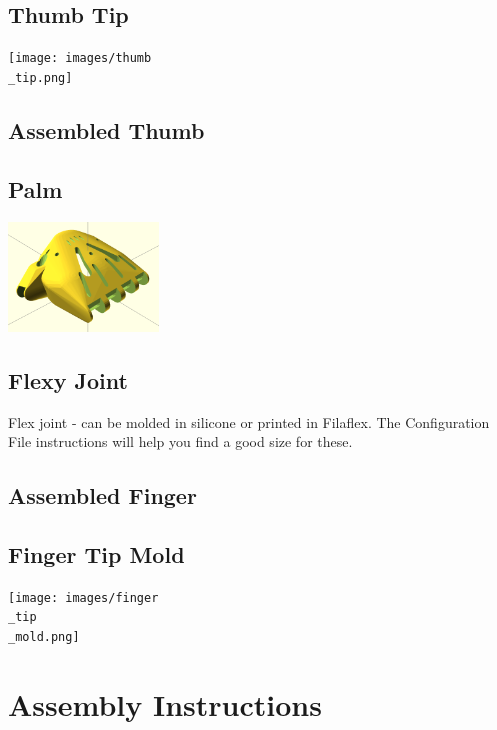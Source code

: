 \documentclass[11pt]{article}
\begin{document}
\hypertarget{thing_thumb\_tip}{\subsection{Thumb Tip}}
\texttt{[image: images/thumb\\\_tip.png]}

\hypertarget{thing_thumb\_assembly}{\subsection{Assembled Thumb}}

\hypertarget{thing_palm}{\subsection{Palm}}
\includegraphics[width=4cm]{images/palm.png}

\hypertarget{thing_flexy\_joint}{\subsection{Flexy Joint}}
Flex joint - can be molded in silicone or printed in Filaflex. The Configuration File instructions will help you find a good size for these.

\hypertarget{thing_finger\_assembly}{\subsection{Assembled Finger}}

\hypertarget{thing_finger\_tip\_mold}{\subsection{Finger Tip Mold}}
\texttt{[image: images/finger\\\_tip\\\_mold.png]}

\newpage

\section{Assembly Instructions}
\end{document}
